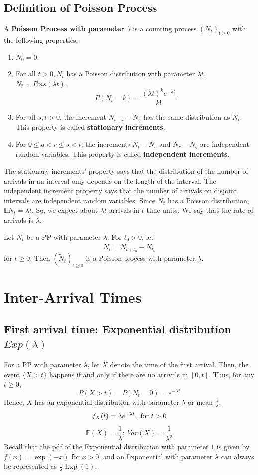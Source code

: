 \documentclass[11pt]{elegantbook}
\begin{document}
\subsection{Definition of Poisson Process}
\begin{definition}[Definition 1 of PP]
        A \textbf{Poisson Process with parameter $\lambda$} is a counting process $\left(N_t\right)_{t \geq 0}$ with the following properties:
        \begin{enumerate}
            \item $N_0=0$.
            \item For all $t>0, N_t$ has a Poisson distribution with parameter $\lambda t$. $N_t\sim Pois(\lambda t)$.
            $$P(N_t=k)=\frac{(\lambda t)^{k}e^{-\lambda t}}{k!}$$
            \item For all $s, t>0$, the increment $N_{t+s}-N_s$ has the same distribution as $N_t$. This property is called \textbf{stationary increments}.
            \item For $0 \leq q<r \leq s<t$, the increments $N_t-N_s$ and $N_r-N_q$ are independent random variables. This property is called \textbf{independent increments}.
        \end{enumerate}
\end{definition}
The stationary increments' property says that the distribution of the number of arrivals in an interval only depends on the length of the interval. The independent increment property says that the number of arrivals on disjoint intervals are independent random variables. Since $N_t$ has a Poisson distribution, $\mathbb{E} N_t=\lambda t$. So, we expect about $\lambda t$ arrivals in $t$ time units. We say that the rate of arrivals is $\lambda$.
\begin{proposition}[Translated PP]
    Let $N_t$ be a PP with parameter $\lambda$. For $t_0 > 0$, let $$\tilde{N}_t=N_{t+t_0}-N_{t_0}$$ for $t\geq 0$. Then $(\tilde{N}_t)_{t\geq 0}$ is a Poisson process with parameter $\lambda$.
\end{proposition}

\section{Inter-Arrival Times}
\subsection{First arrival time: Exponential distribution $Exp(\lambda)$}
For a PP with parameter $\lambda$, let $X$ denote the time of the first arrival. Then, the event $\{X>t\}$ happens if and only if there are no arrivals in $[0, t]$. Thus, for any $t \geq 0$,
$$
P(X>t)=P\left(N_t=0\right)=e^{-\lambda t}
$$
Hence, $X$ has an exponential distribution with parameter $\lambda$ or mean $\frac{1}{\lambda}$.
$$f_{X}(t)=\lambda e^{-\lambda t},\ \textnormal{for } t>0$$
$$\mathbb{E}(X)=\frac{1}{\lambda};\ Var(X)=\frac{1}{\lambda^2}$$
Recall that the pdf of the Exponential distribution with parameter $1$ is given by $f(x)=\exp (-x)$ for $x>0$, and an Exponential with parameter $\lambda$ can always be represented as $\frac{1}{\lambda} \operatorname{Exp}(1)$.
\end{document}
